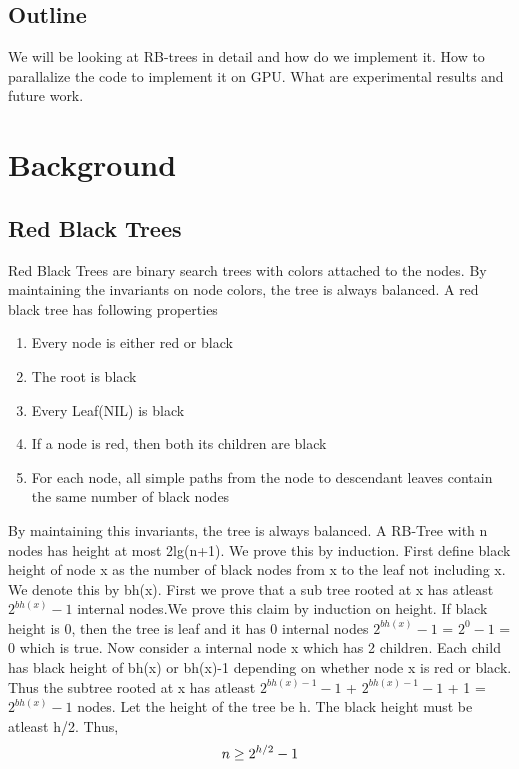 \documentclass[BTech]{iitmdiss}
\begin{document}
\section{Outline}
We will be looking at RB-trees in detail and how do we implement it. How to parallalize the code to implement it on GPU. What are experimental results and future work.

\chapter{Background}
\section{Red Black Trees}
Red Black Trees are binary search trees with colors attached to the nodes. By maintaining the invariants on node colors, the tree is always balanced. A red black tree has following properties\\
\begin{enumerate}  
\item Every node is either red or black
\item The root is black
\item Every Leaf(NIL) is black
\item If a node is red, then both its children are black
\item For each node, all simple paths from the node to descendant leaves contain the same number of black nodes
\end{enumerate} 
By maintaining this invariants, the tree is always balanced. A RB-Tree with n nodes has height at most 2lg(n+1). We prove this by induction. First define black height of node x as the number of black nodes from x to the leaf not including x. We denote this by bh(x). First we prove that a sub tree rooted at x has atleast $2^{bh(x)}-1$ internal nodes.We prove this claim by induction on height. If black height is 0, then the tree is leaf and it has 0 internal nodes $2^{bh(x)}-1$ = $2^{0}-1$ = 0 which is true. Now consider a internal node x which has 2 children. Each child has black height of bh(x) or bh(x)-1 depending on whether node x is red or black. Thus the subtree rooted at x has atleast $2^{bh(x)-1}-1$ + $2^{bh(x)-1}-1$ + 1 = $2^{bh(x)}-1 $ nodes. Let the height of the tree be h. The black height must be atleast h/2. Thus,\\
\begin{equation}
        n \ge 2^{h/2} - 1\\
\end{equation}
\end{document}
